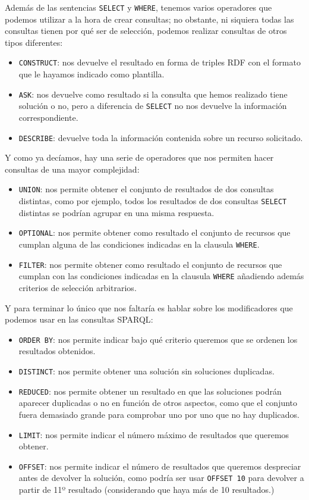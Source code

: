 Además de las sentencias {\tt SELECT} y {\tt WHERE}, tenemos varios operadores que podemos utilizar a la hora de crear consultas; no obstante, ni siquiera todas las consultas tienen por qué ser de selección, podemos realizar consultas de otros tipos diferentes:

\begin{itemize}
	\item {\tt CONSTRUCT}: nos devuelve el resultado en forma de triples {\sf RDF} con el formato que le hayamos indicado como plantilla.
	\item {\tt ASK}: nos devuelve como resultado si la consulta que hemos realizado tiene solución o no, pero a diferencia de {\tt SELECT} no nos devuelve la información correspondiente.
	\item {\tt DESCRIBE}: devuelve toda la información contenida sobre un recurso solicitado.
\end{itemize}

Y como ya decíamos, hay una serie de operadores que nos permiten hacer consultas de una mayor complejidad:

\begin{itemize}
	\item {\tt UNION}: nos permite obtener el conjunto de resultados de dos consultas distintas, como por ejemplo, todos los resultados de dos consultas {\tt SELECT} distintas se podrían agrupar en una misma respuesta.
	\item {\tt OPTIONAL}: nos permite obtener como resultado el conjunto de recursos que cumplan alguna de las condiciones indicadas en la clausula {\tt WHERE}.
	\item {\tt FILTER}: nos permite obtener como resultado el conjunto de recursos que cumplan con las condiciones indicadas en la clausula {\tt WHERE} añadiendo además criterios de selección arbitrarios.
\end{itemize}

Y para terminar lo único que nos faltaría es hablar sobre los modificadores que podemos usar en las consultas {\sf SPARQL}:

\begin{itemize}
	\item {\tt ORDER BY}: nos permite indicar bajo qué criterio queremos que se ordenen los resultados obtenidos.
	\item {\tt DISTINCT}: nos permite obtener una solución sin soluciones duplicadas.
	\item {\tt REDUCED}: nos permite obtener un resultado en que las soluciones podrán aparecer duplicadas o no en función de otros aspectos, como que el conjunto fuera demasiado grande para comprobar uno por uno que no hay duplicados.
	\item {\tt LIMIT}: nos permite indicar el número máximo de resultados que queremos obtener.
	\item {\tt OFFSET}: nos permite indicar el número de resultados que queremos despreciar antes de devolver la solución, como podría ser usar {\tt OFFSET 10} para devolver a partir de 11º resultado (considerando que haya más de 10 resultados.)
\end{itemize}

